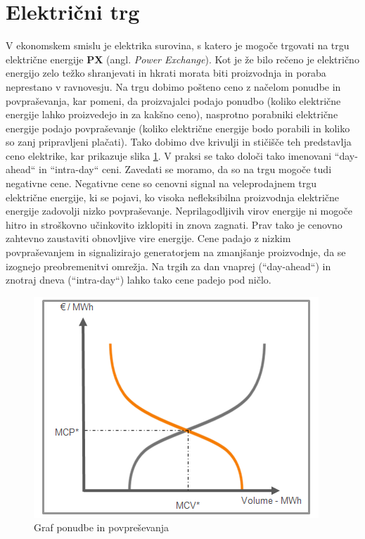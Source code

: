 \documentclass[12pt,a4paper]{amsart}
\theoremstyle{definition} %
\theoremstyle{plain} %
\begin{document}
{\section*{Električni trg}

V ekonomskem smislu je elektrika surovina, s katero je mogoče trgovati na trgu električne energije \textbf{PX} (angl. \textit{Power Exchange}). Kot je že bilo rečeno je električno energijo zelo težko shranjevati in hkrati morata biti proizvodnja in poraba neprestano v ravnovesju.
 Na trgu dobimo pošteno ceno z načelom ponudbe in povpraševanja, kar pomeni, da proizvajalci podajo ponudbo (koliko električne energije lahko proizvedejo in za kakšno ceno), nasprotno porabniki električne energije podajo povpraševanje (koliko električne energije bodo porabili in koliko so zanj pripravljeni plačati). 
Tako dobimo dve krivulji in stičišče teh predstavlja ceno elektrike, kar prikazuje slika \ref{fig:postena_cena}. V praksi se tako določi tako imenovani ``day-ahead`` in ``intra-day`` ceni. Zavedati se moramo, da so na trgu mogoče tudi negativne cene.
 Negativne cene so cenovni signal na veleprodajnem trgu električne energije, ki se pojavi, ko visoka nefleksibilna proizvodnja električne energije zadovolji nizko povpraševanje. Neprilagodljivih virov energije ni mogoče hitro in stroškovno učinkovito izklopiti in znova zagnati. Prav tako je cenovno zahtevno zaustaviti obnovljive vire energije.  
 Cene padajo z nizkim povpraševanjem in signalizirajo generatorjem na zmanjšanje proizvodnje, da se izognejo preobremenitvi omrežja. Na trgih za dan vnaprej (``day-ahead``) in znotraj dneva (``intra-day``) lahko tako cene padejo pod ničlo.

\begin{figure}[h]
    \centering
    \includegraphics[scale=0.75]{curve}
    \caption{Graf ponudbe in povpreševanja}
    \label{fig:postena_cena}
\end{figure}

}
\end{document}
